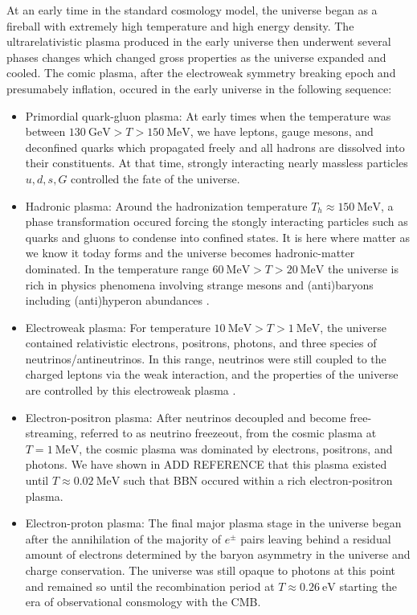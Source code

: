 \documentclass[Universe,article,submit,moreauthors,pdftex]{Definitions/mdpi}
\newcommand*{\xred}{\color{red}}
\begin{document}
At an early time in the standard cosmology model, the universe began as a fireball with extremely high temperature and high energy density. The ultrarelativistic plasma produced in the early universe then underwent several phases changes which changed gross properties as the universe expanded and cooled. The comic plasma, after the electroweak symmetry breaking epoch and presumabely inflation, occured in the early universe in the following sequence:
\begin{itemize}
  \item Primordial quark-gluon plasma: At early times when the temperature was between $130\ \mathrm{GeV}>T>150\ \mathrm{MeV}$, we have leptons, gauge mesons, and deconfined quarks which propagated freely and all hadrons are dissolved into their constituents. At that time, strongly interacting nearly massless particles $u,d,s,G$ controlled the fate of the universe.
  \item Hadronic plasma: Around the hadronization temperature $T_h\approx150\ \mathrm{MeV}$, a phase transformation occured forcing the stongly interacting particles such as quarks and gluons to condense into confined states. It is here where matter as we know it today forms and the universe becomes hadronic-matter dominated. In the temperature range $ 60\ \mathrm{MeV}>T>20\ \mathrm{MeV}$ the universe is rich in physics phenomena involving strange mesons and (anti)baryons including (anti)hyperon abundances \cite{Fromerth:2012fe,Yang:2021bko}.
  \item  Electroweak plasma: For temperature $10\ \mathrm{MeV}>T>1\ \mathrm{MeV}$, the universe contained relativistic electrons, positrons, photons, and three species of neutrinos/antineutrinos. In this range, neutrinos were still coupled to the charged leptons via the weak interaction, and the properties of the universe are controlled by this electroweak plasma \cite{Birrell:2012gg}.
  \item  Electron-positron plasma: After neutrinos decoupled and become free-streaming, referred to as neutrino freezeout, from the cosmic plasma at $T=1\ \mathrm{MeV}$, the cosmic plasma was dominated by electrons, positrons, and photons. We have shown in {\xred ADD REFERENCE} that this plasma existed until $T\approx0.02\ \mathrm{MeV}$ such that BBN occured within a rich electron-positron plasma.
  \item Electron-proton plasma: The final major plasma stage in the universe began after the annihilation of the majority of $e^{\pm}$ pairs leaving behind a residual amount of electrons determined by the baryon asymmetry in the universe and charge conservation. The universe was still opaque to photons at this point and remained so until the recombination period at $T\approx0.26\ \mathrm{eV}$ starting the era of observational consmology with the CMB.
\end{itemize}
\end{document}
